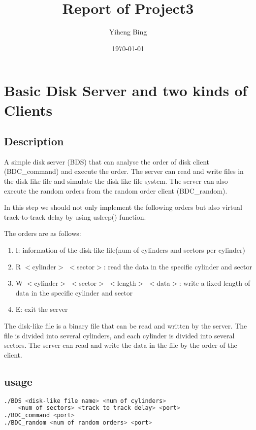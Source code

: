 \documentclass[a4paper]{article}
\title{Report of Project3}
\author{Yiheng Bing}
\date{\today}
\begin{document}
\maketitle

\tableofcontents
\newpage

\section{Basic Disk Server and two kinds of Clients}
\subsection{Description}

A simple disk server (BDS) that can analyse the order of disk client (BDC\_command) and execute the order. 
The server can read and write files in the disk-like file and simulate the disk-like file system. 
The server can also execute the random orders from the random order client (BDC\_random). 

In this step we should not only implement the following orders but also virtual track-to-track delay by using usleep() function.

The orders are as follows:
\begin{enumerate}
    \item I: information of the disk-like file(num of cylinders and sectors per cylinder)
    \item R $<$cylinder$>$ $<$sector$>$: read the data in the specific cylinder and sector
    \item W $<$cylinder$>$ $<$sector$>$ $<$length$>$ $<$data$>$: write a fixed length of data in the specific cylinder and sector
    \item E: exit the server
\end{enumerate}

The disk-like file is a binary file that can be read and written by the server. The file is divided into several cylinders, and each cylinder is divided into several sectors. The server can read and write the data in the file by the order of the client.
\subsection{usage}
\begin{lstlisting}[language = bash]
./BDS <disk-like file name> <num of cylinders> 
    <num of sectors> <track to track delay> <port> 
./BDC_command <port>
./BDC_random <num of random orders> <port>
\end{lstlisting}
\end{document}
